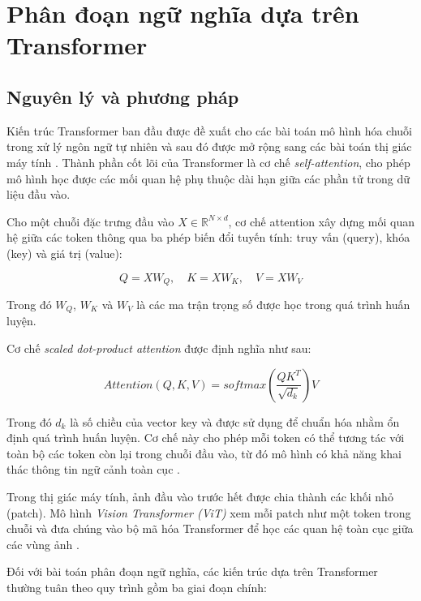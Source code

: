 \section{Phân đoạn ngữ nghĩa dựa trên Transformer}

\subsection{Nguyên lý và phương pháp}

Kiến trúc Transformer ban đầu được đề xuất cho các bài toán mô hình hóa chuỗi trong xử lý ngôn ngữ tự nhiên và sau đó được mở rộng sang các bài toán thị giác máy tính \cite{vaswani2017attention}. 
Thành phần cốt lõi của Transformer là cơ chế \textit{self-attention}, cho phép mô hình học được các mối quan hệ phụ thuộc dài hạn giữa các phần tử trong dữ liệu đầu vào.

Cho một chuỗi đặc trưng đầu vào $X \in \mathbb{R}^{N \times d}$, cơ chế attention xây dựng mối quan hệ giữa các token thông qua ba phép biến đổi tuyến tính: truy vấn (query), khóa (key) và giá trị (value):

\begin{equation}
Q = XW_Q,\quad K = XW_K,\quad V = XW_V
\end{equation}

Trong đó $W_Q$, $W_K$ và $W_V$ là các ma trận trọng số được học trong quá trình huấn luyện.

Cơ chế \textit{scaled dot-product attention} được định nghĩa như sau:

\begin{equation}
Attention(Q,K,V) = softmax\left(\frac{QK^T}{\sqrt{d_k}}\right)V
\end{equation}

Trong đó $d_k$ là số chiều của vector key và được sử dụng để chuẩn hóa nhằm ổn định quá trình huấn luyện. 
Cơ chế này cho phép mỗi token có thể tương tác với toàn bộ các token còn lại trong chuỗi đầu vào, từ đó mô hình có khả năng khai thác thông tin ngữ cảnh toàn cục \cite{vaswani2017attention}.

Trong thị giác máy tính, ảnh đầu vào trước hết được chia thành các khối nhỏ (patch). 
Mô hình \textit{Vision Transformer (ViT)} xem mỗi patch như một token trong chuỗi và đưa chúng vào bộ mã hóa Transformer để học các quan hệ toàn cục giữa các vùng ảnh \cite{dosovitskiy2020image}.

Đối với bài toán phân đoạn ngữ nghĩa, các kiến trúc dựa trên Transformer thường tuân theo quy trình gồm ba giai đoạn chính:

